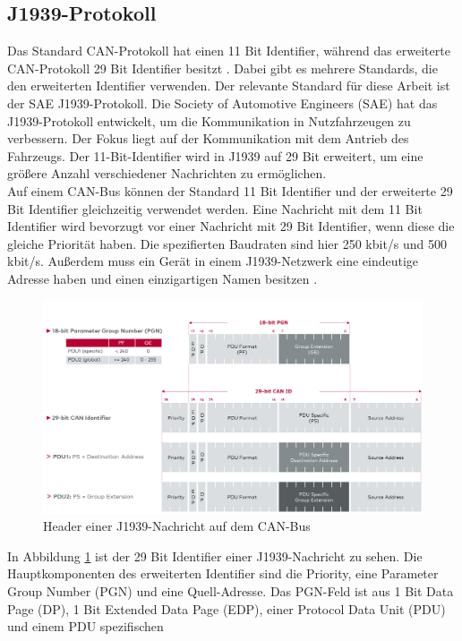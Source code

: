 \subsection{J1939-Protokoll} \label{sec:j1939}
Das Standard CAN-Protokoll hat einen 11 Bit Identifier, während das erweiterte CAN-Protokoll 29 Bit Identifier
besitzt \cite{Murvay2018}. Dabei gibt es mehrere Standards, die den erweiterten Identifier verwenden.
Der relevante Standard für diese Arbeit ist der SAE J1939-Protokoll.
Die Society of Automotive Engineers (SAE) hat das J1939-Protokoll entwickelt, um die Kommunikation in Nutzfahrzeugen
zu verbessern. Der Fokus liegt auf der Kommunikation mit dem Antrieb des Fahrzeugs. Der 11-Bit-Identifier wird in J1939 
auf 29 Bit erweitert, um eine größere Anzahl verschiedener Nachrichten zu ermöglichen.\\
Auf einem CAN-Bus können der Standard 11 Bit Identifier und der erweiterte 29 Bit Identifier gleichzeitig verwendet werden.
Eine Nachricht mit dem 11 Bit Identifier wird bevorzugt vor einer Nachricht mit 29 Bit Identifier, wenn diese die gleiche
Priorität haben. Die spezifierten Baudraten sind hier 250 kbit/s und 500 kbit/s. 
Außerdem muss ein Gerät in einem J1939-Netzwerk eine eindeutige Adresse haben und einen einzigartigen Namen besitzen \cite{JungerJ1939}.
\begin{figure}[H]
    \centering
    \includegraphics[scale=0.28]{images/j1939header.png}
    \caption{Header einer J1939-Nachricht auf dem CAN-Bus \cite{VectorSAE}}
    \label{fig:j1939header}
\end{figure}
In Abbildung \ref{fig:j1939header} ist der 29 Bit Identifier einer J1939-Nachricht zu sehen.
Die Hauptkomponenten des erweiterten Identifier sind die Priority, eine Parameter Group Number (PGN) und eine Quell-Adresse.
Das PGN-Feld ist aus 1 Bit Data Page (DP), 1 Bit Extended Data Page (EDP), einer Protocol Data Unit (PDU) und einem PDU spezifischen 
